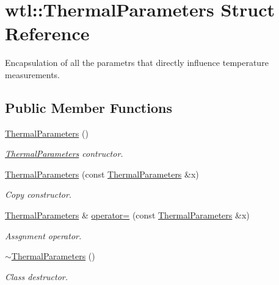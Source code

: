 \hypertarget{structwtl_1_1_thermal_parameters}{}\section{wtl\+:\+:Thermal\+Parameters Struct Reference}
\label{structwtl_1_1_thermal_parameters}


Encapsulation of all the parametrs that directly influence temperature measurements.  


\subsection*{Public Member Functions}
\begin{DoxyCompactItemize}
\item 
\hyperlink{structwtl_1_1_thermal_parameters_af0b6832e344389a25396b50ac11dac21}{Thermal\+Parameters} ()
\begin{DoxyCompactList}\small\item\em \hyperlink{structwtl_1_1_thermal_parameters}{Thermal\+Parameters} contructor. \end{DoxyCompactList}\item 
\hyperlink{structwtl_1_1_thermal_parameters_a38c0ade2f399259ba8f53efb15decae2}{Thermal\+Parameters} (const \hyperlink{structwtl_1_1_thermal_parameters}{Thermal\+Parameters} \&x)
\begin{DoxyCompactList}\small\item\em Copy constructor. \end{DoxyCompactList}\item 
\hyperlink{structwtl_1_1_thermal_parameters}{Thermal\+Parameters} \& \hyperlink{structwtl_1_1_thermal_parameters_a46f24c6affb8c7f2aa1cdebebf9a80e0}{operator=} (const \hyperlink{structwtl_1_1_thermal_parameters}{Thermal\+Parameters} \&x)
\begin{DoxyCompactList}\small\item\em Assgnment operator. \end{DoxyCompactList}\item 
\hyperlink{structwtl_1_1_thermal_parameters_a618582bffc84d4aae6fec5cab0ee5bec}{$\sim$\+Thermal\+Parameters} ()
\begin{DoxyCompactList}\small\item\em Class destructor. \end{DoxyCompactList}\end{DoxyCompactItemize}
